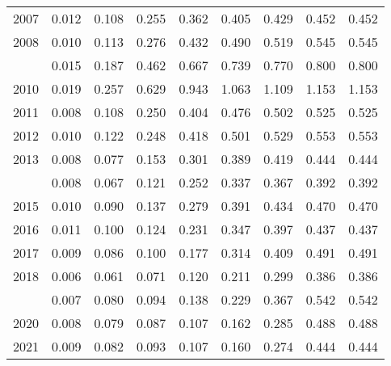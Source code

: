 \documentclass[
]{article}
\begin{document}
\begin{longtable}[t]{lrrrrrrrr}
2007 & 0.012 & 0.108 & 0.255 & 0.362 & 0.405 & 0.429 & 0.452 & 0.452\\
2008 & 0.010 & 0.113 & 0.276 & 0.432 & 0.490 & 0.519 & 0.545 & 0.545\\
\addlinespace
2009 & 0.015 & 0.187 & 0.462 & 0.667 & 0.739 & 0.770 & 0.800 & 0.800\\
2010 & 0.019 & 0.257 & 0.629 & 0.943 & 1.063 & 1.109 & 1.153 & 1.153\\
2011 & 0.008 & 0.108 & 0.250 & 0.404 & 0.476 & 0.502 & 0.525 & 0.525\\
2012 & 0.010 & 0.122 & 0.248 & 0.418 & 0.501 & 0.529 & 0.553 & 0.553\\
2013 & 0.008 & 0.077 & 0.153 & 0.301 & 0.389 & 0.419 & 0.444 & 0.444\\
\addlinespace
2014 & 0.008 & 0.067 & 0.121 & 0.252 & 0.337 & 0.367 & 0.392 & 0.392\\
2015 & 0.010 & 0.090 & 0.137 & 0.279 & 0.391 & 0.434 & 0.470 & 0.470\\
2016 & 0.011 & 0.100 & 0.124 & 0.231 & 0.347 & 0.397 & 0.437 & 0.437\\
2017 & 0.009 & 0.086 & 0.100 & 0.177 & 0.314 & 0.409 & 0.491 & 0.491\\
2018 & 0.006 & 0.061 & 0.071 & 0.120 & 0.211 & 0.299 & 0.386 & 0.386\\
\addlinespace
2019 & 0.007 & 0.080 & 0.094 & 0.138 & 0.229 & 0.367 & 0.542 & 0.542\\
2020 & 0.008 & 0.079 & 0.087 & 0.107 & 0.162 & 0.285 & 0.488 & 0.488\\
2021 & 0.009 & 0.082 & 0.093 & 0.107 & 0.160 & 0.274 & 0.444 & 0.444\\*
\end{longtable}
\end{document}
